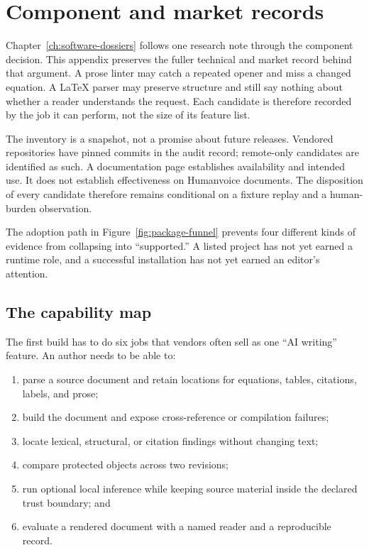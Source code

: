 \chapter{Component and market records}
\label{app:component-records}

Chapter~\ref{ch:software-dossiers} follows one research note through the
component decision. This appendix preserves the fuller technical and market
record behind that argument. A prose linter may catch a repeated opener and
miss a changed equation. A LaTeX parser may preserve structure and still say
nothing about whether a reader understands the request. Each candidate is
therefore recorded by the job it can perform, not the size of its feature list.

The inventory is a snapshot, not a promise about future releases. Vendored
repositories have pinned commits in the audit record; remote-only candidates
are identified as such. A documentation page establishes availability and
intended use. It does not establish effectiveness on Humanvoice documents.
The disposition of every candidate therefore remains conditional on a fixture
replay and a human-burden observation.

The adoption path in Figure~\ref{fig:package-funnel} prevents four different
kinds of evidence from collapsing into ``supported.'' A listed project has not
yet earned a runtime role, and a successful installation has not yet earned an
editor's attention.

\section{The capability map}
\label{sec:software-capabilities}

The first build has to do six jobs that vendors often sell as one ``AI
writing'' feature. An author needs to be able to:

\begin{enumerate}
\item parse a source document and retain locations for equations, tables,
      citations, labels, and prose;
\item build the document and expose cross-reference or compilation failures;
\item locate lexical, structural, or citation findings without changing text;
\item compare protected objects across two revisions;
\item run optional local inference while keeping source material inside the
      declared trust boundary; and
\item evaluate a rendered document with a named reader and a reproducible
      record.
\end{enumerate}

